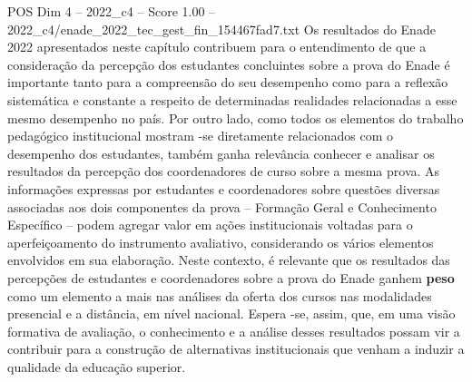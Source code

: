 \begin{textsample}{POS Dim 4 – 2022\_c4 – Score 1.00 – 2022\_c4/enade\_2022\_tec\_gest\_fin\_154467fad7.txt}
Os resultados do Enade 2022 apresentados neste capítulo contribuem para o entendimento de que a consideração da percepção dos estudantes concluintes sobre a prova do Enade é importante tanto para a compreensão do seu desempenho como para a reflexão sistemática e constante a respeito de determinadas realidades relacionadas a esse mesmo desempenho no país.
Por outro lado, como todos os elementos do trabalho pedagógico institucional mostram -se diretamente relacionados com o desempenho dos estudantes, também ganha relevância conhecer e analisar os resultados da percepção dos coordenadores de curso sobre a mesma prova.
As informações expressas por estudantes e coordenadores sobre questões diversas associadas aos dois componentes da prova – Formação Geral e Conhecimento Específico – podem agregar valor em ações institucionais voltadas para o aperfeiçoamento do instrumento avaliativo, considerando os vários elementos envolvidos em sua elaboração.
Neste contexto, é relevante que os resultados das percepções de estudantes e coordenadores sobre a prova do Enade ganhem \textbf{peso} como um elemento a mais nas análises da oferta dos cursos nas modalidades presencial e a distância, em nível nacional.
Espera -se, assim, que, em uma visão formativa de avaliação, o conhecimento e a análise desses resultados possam vir a contribuir para a construção de alternativas institucionais que venham a induzir a qualidade da educação superior.

\end{textsample}
